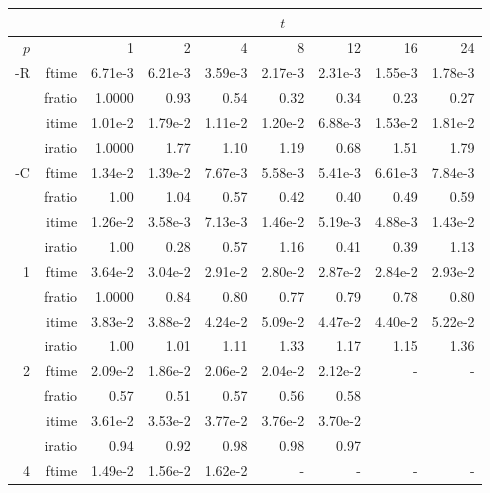 \documentclass[a4]{article}
\begin{document}
\begin{table}
\begin{center}
\begin{tabular}{|r|r|r|r|r|r|r|r|r|}
\hline 
     &  & \multicolumn{7}{c|}{$t$} \\ \hline
    $p$  &  & 1           & 2    & 4    & 8    & 12   & 16    & 24  \\ \hline\hline
    -R  & ftime &  6.71e-3 &   6.21e-3 &   3.59e-3 &   2.17e-3 &   2.31e-3 &   1.55e-3 &   1.78e-3    \\ 
      & fratio &  1.0000 &    0.93 &   0.54 &   0.32 &   0.34 &   0.23 &   0.27   \\ 
     & itime &    1.01e-2 &   1.79e-2 &   1.11e-2 &   1.20e-2 &   6.88e-3 &   1.53e-2 &   1.81e-2    \\ 
     & iratio &   1.0000 &    1.77 &    1.10 &    1.19 &    0.68 &   1.51 &    1.79    \\  \hline
    -C  & ftime &  1.34e-2 &   1.39e-2 &   7.67e-3 &   5.58e-3 &   5.41e-3 &   6.61e-3 &   7.84e-3   \\ 
      & fratio & 1.00 &   1.04 &   0.57 &   0.42 &   0.40 &   0.49 &   0.59    \\ 
     & itime &   1.26e-2 &   3.58e-3 &   7.13e-3 &   1.46e-2 &   5.19e-3 &   4.88e-3 &   1.43e-2     \\ 
     & iratio &  1.00 &   0.28 &   0.57 &   1.16 &   0.41 &   0.39 &   1.13   \\ \hline \hline
    1  & ftime & 3.64e-2 &   3.04e-2 &   2.91e-2 &   2.80e-2 &   2.87e-2 &   2.84e-2 &   2.93e-2     \\ 
      & fratio &  1.0000 &   0.84 &   0.80 &   0.77 &   0.79 &   0.78 &   0.80   \\ 
     & itime &  3.83e-2 &   3.88e-2 &   4.24e-2 &   5.09e-2 &   4.47e-2 &   4.40e-2 &   5.22e-2     \\ 
     & iratio & 1.00 &   1.01 &   1.11 &   1.33 &   1.17 &   1.15 &   1.36      \\ \hline
    2  & ftime & 2.09e-2 &   1.86e-2 &   2.06e-2 &   2.04e-2 &   2.12e-2 &    - & - \\ 
      & fratio &  0.57 &   0.51 &   0.57 &   0.56 &   0.58 &      &  \\
      & itime &  3.61e-2 &   3.53e-2 &   3.77e-2 &   3.76e-2 &   3.70e-2 &      &  \\
      & iratio &    0.94 &   0.92 &   0.98 &   0.98 &   0.97 &   &  \\ \hline
    4  & ftime &   1.49e-2 &   1.56e-2 &   1.62e-2 &  - & - & - & - \\ 

\end{tabular}
\end{center}
\end{table}
\end{document}
